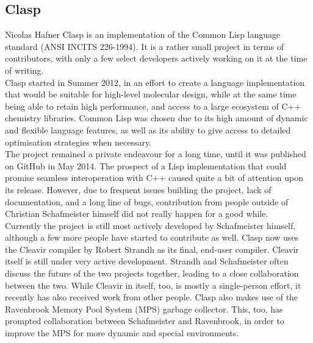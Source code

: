 \subsection{Clasp}{Nicolas Hafner}
Clasp\cite{clasp-github} is an implementation of the Common Lisp language standard (ANSI INCITS 226-1994). It is a rather small project in terms of contributors, with only a few select developers actively working on it at the time of writing. \\

Clasp started in Summer 2012\cite{clasp-timeline}, in an effort to create a language implementation that would be suitable for high-level molecular design, while at the same time being able to retain high performance, and access to a large ecosystem of C++ chemistry libraries\cite{clasp-cando}. Common Lisp was chosen due to its high amount of dynamic and flexible language features, as well as its ability to give access to detailed optimisation strategies when necessary\cite{clasp-talk}. \\

The project remained a private endeavour for a long time, until it was published on GitHub in May 2014\cite{clasp-github}. The prospect of a Lisp implementation that could promise seamless interoperation with C++ caused quite a bit of attention upon its release. However, due to frequent issues building the project, lack of documentation, and a long line of bugs, contribution from people outside of Christian Schafmeister himself did not really happen for a good while. \\

Currently the project is still most actively developed by Schafmeister himself, although a few more people have started to contribute as well. Clasp now uses the Cleavir compiler by Robert Strandh\cite{clasp-cleavir} as its final, end-user compiler. Cleavir itself is still under very active development. Strandh and Schafmeister often discuss the future of the two projects together, leading to a close collaboration between the two. While Cleavir in itself, too, is mostly a single-person effort, it recently has also received work from other people. Clasp also makes use of the Ravenbrook Memory Pool System (MPS)\cite{clasp-mps} garbage collector. This, too, has prompted collaboration between Schafmeister and Ravenbrook, in order to improve the MPS for more dynamic and special environments. 

